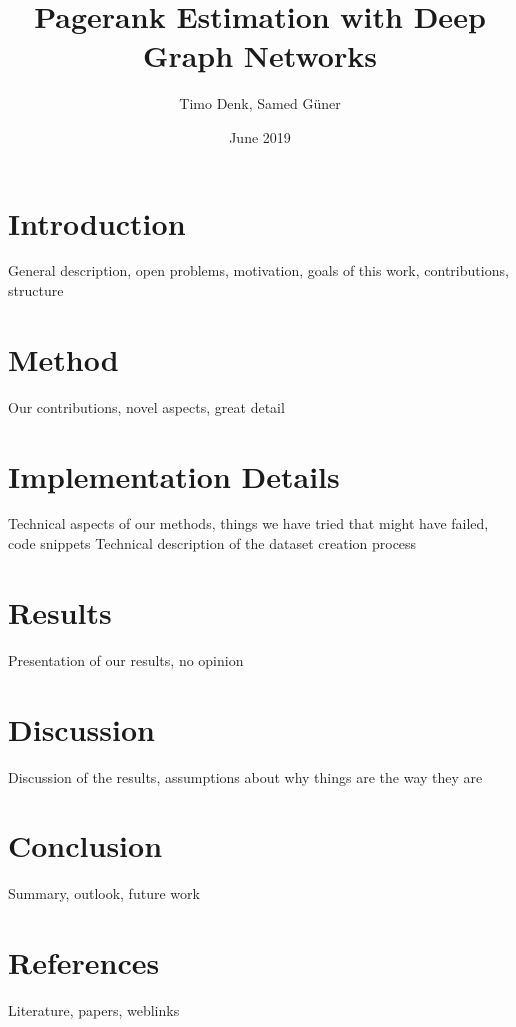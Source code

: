 \documentclass{article}
\title{Pagerank Estimation with Deep Graph Networks}
\author{Timo Denk, Samed Güner}
\date{June 2019}
\begin{document}
\maketitle

\section{Introduction}
General description, open problems, motivation, goals of this work, contributions, structure



\section{Method}
Our contributions, novel aspects, great detail



\section{Implementation Details}
Technical aspects of our methods, things we have tried that might have failed, code snippets
Technical description of the dataset creation process

\section{Results}
Presentation of our results, no opinion

\section{Discussion}
Discussion of the results, assumptions about why things are the way they are

\section{Conclusion}
Summary, outlook, future work

\section{References}
Literature, papers, weblinks
\printbibliography
\end{document}
